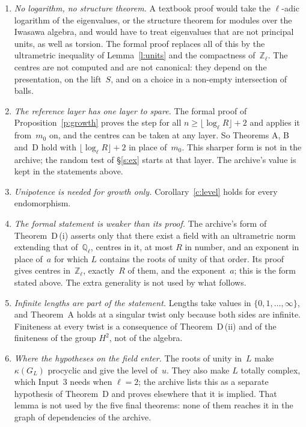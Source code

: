 \documentclass[11pt,a4paper]{article}
\newcommand{\Q}{\mathbb{Q}}
\newcommand{\Z}{\mathbb{Z}}
\newcommand{\m}[1]{\mbox{$#1$}}        %
\theoremstyle{plainx}
\theoremstyle{uprightx}
\begin{document}
\begin{enumerate}[label=\textup{\arabic*.},leftmargin=1.6em,itemsep=5pt]
\item \emph{No logarithm, no structure theorem.} A textbook proof would take the $\ell$-adic logarithm of the
eigenvalues, or the structure theorem for modules over the Iwasawa algebra, and would have to treat eigenvalues
that are not principal units, as well as torsion. The formal proof replaces all of this by the ultrametric
inequality of Lemma~\ref{l:units} and the compactness of~$\Z_\ell$. The centres are not computed and are not
canonical: they depend on the presentation, on the lift~$S$, and on a choice in a non-empty intersection of balls.
\item \emph{The reference layer has one layer to spare.} The formal proof of Proposition~\ref{p:growth} proves
the step for all \m{n\ge\lfloor\log_\ell R\rfloor+2} and applies it from~$m_0$ on, and the centres can be taken
at any layer. So Theorems A, B and~D hold with \m{\lfloor\log_\ell R\rfloor+2} in place of~$m_0$. This sharper
form is not in the archive; the random test of §\ref{s:ex} starts at that layer. The archive's value is kept in
the statements above.
\item \emph{Unipotence is needed for growth only.} Corollary~\ref{c:level} holds for every endomorphism.
\item \emph{The formal statement is weaker than its proof.} The archive's form of Theorem~D\,(i) asserts only
that there exist a field with an ultrametric norm extending that of~$\Q_\ell$, centres in it, at most $R$ in
number, and an exponent in place of~$a$ for which $L$ contains the roots of unity of that order. Its proof gives
centres in~$\Z_\ell$, exactly~$R$ of them, and the exponent~$a$; this is the form stated above. The extra
generality is not used by what follows.
\item \emph{Infinite lengths are part of the statement.} Lengths take values in \m{\{0,1,\dots,\infty\}}, and
Theorem~A holds at a singular twist only because both sides are infinite. Finiteness at every twist is a
consequence of Theorem~D\,(ii) and of the finiteness of the group $H^2$, not of the algebra.
\item \emph{Where the hypotheses on the field enter.} The roots of unity in~$L$ make \m{\kappa(G_L)} procyclic
and give the level of~$u$. They also make $L$ totally complex, which Input~3 needs when \m{\ell=2}; the archive
lists this as a separate hypothesis of Theorem~D and proves elsewhere that it is implied. That lemma is not
used by the five final theorems: none of them reaches it in the graph of dependencies of the archive.

\end{enumerate}
\end{document}
